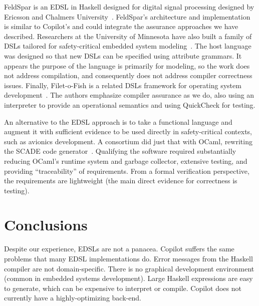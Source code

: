 \documentclass[9pt]{sigplanconf}
\begin{document}

FeldSpar is an EDSL in Haskell designed for digital signal processing designed
by Ericsson and Chalmers University~\cite{feldspar1}.  FeldSpar's architecture
and implementation is similar to Copilot's and could integrate the assurance
approaches we have described.  Researchers at the University of Minnesota have
also built a family of DSLs tailored for safety-critical embedded system
modeling~\cite{mats}.  The host language was designed so that new DSLs can be
specified using attribute grammars.  It appears the purpose of the language is
primarily for modeling, so the work does not address compilation, and
consequently does not address compiler correctness issues.  Finally,
Filet-o-Fish is a related DSLs framework for operating system
development~\cite{fof}.  The authors emphasize compiler assurance as we do, also
using an interpreter to provide an operational semantics and using QuickCheck
for testing.

An alternative to the EDSL approach is to take a functional language and augment
it with sufficient evidence to be used directly in safety-critical contexts,
such as avionics development.  A consortium did just that with OCaml, rewriting
the SCADE code generator~\cite{ocaml}.  Qualifying the software required
substantially reducing OCaml's runtime system and garbage collector, extensive
testing, and providing ``traceability'' of requirements.  From a formal
verification perspective, the requirements are lightweight (the main direct
evidence for correctness is testing).



\section{Conclusions}
\label{sec:conclusions}

Despite our experience, EDSLs are not a panacea.  Copilot suffers the same
problems that many EDSL implementations do.  Error messages from the Haskell
compiler are not domain-specific.  There is no graphical development environment
(common in embedded systems development).  Large Haskell expressions are easy to
generate, which can be expensive to interpret or compile.  Copilot does not
currently have a highly-optimizing back-end.
\end{document}
